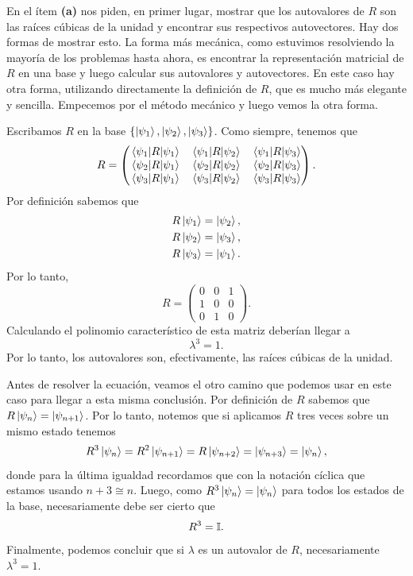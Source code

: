 \documentclass[10pt, a4paper]{article}
\numberwithin{equation}{subsection}
\begin{document}
\bigbreak

En el ítem \textbf{(a)} nos piden, en primer lugar, mostrar que los autovalores
de $R$ son las raíces cúbicas de la unidad y encontrar sus respectivos
autovectores. Hay dos formas de mostrar esto. La forma más mecánica, como
estuvimos resolviendo la mayoría de los problemas hasta ahora, es encontrar la
representación matricial de $R$ en una base y luego calcular sus autovalores y
autovectores. En este caso hay otra forma, utilizando directamente la
definición de $R$, que es mucho más elegante y sencilla. Empecemos por el
método mecánico y luego vemos la otra forma.

Escribamos $R$ en la base $\set{\ket{\psi_1}, \ket{\psi_2}, \ket{\psi_3}}$.
Como siempre, tenemos que
\begin{equation}
  R = \begin{pmatrix}
    \matrixel{\psi_1}{R}{\psi_1} &
    \matrixel{\psi_1}{R}{\psi_2} &
    \matrixel{\psi_1}{R}{\psi_3} \\
    \matrixel{\psi_2}{R}{\psi_1} &
    \matrixel{\psi_2}{R}{\psi_2} &
    \matrixel{\psi_2}{R}{\psi_3} \\
    \matrixel{\psi_3}{R}{\psi_1} &
    \matrixel{\psi_3}{R}{\psi_2} &
    \matrixel{\psi_3}{R}{\psi_3}
  \end{pmatrix}.
\end{equation}
Por definición sabemos que
\begin{align}
  R\ket{\psi_1} &= \ket{\psi_2}, \\
  R\ket{\psi_2} &= \ket{\psi_3}, \\
  R\ket{\psi_3} &= \ket{\psi_1}.
\end{align}
Por lo tanto,
\begin{equation}
  R = \begin{pmatrix} 0 & 0 & 1 \\ 1 & 0 & 0 \\ 0 & 1 & 0 \end{pmatrix}.
\end{equation}
Calculando el polinomio característico de esta matriz deberían llegar a
\begin{equation}
  \lambda^3 = 1.
\end{equation}
Por lo tanto, los autovalores son, efectivamente, las raíces cúbicas de la
unidad.

Antes de resolver la ecuación, veamos el otro camino que podemos usar en este
caso para llegar a esta misma conclusión. Por definición de $R$ sabemos
que $R\ket{\psi_n} = \ket{\psi_{n+1}}$. Por lo tanto, notemos que si aplicamos
$R$ tres veces sobre un mismo estado tenemos
\begin{equation}
  R^3\ket{\psi_n} = R^2\ket{\psi_{n+1}} = R\ket{\psi_{n+2}} = \ket{\psi_{n+3}}
  = \ket{\psi_n},
\end{equation}
donde para la última igualdad recordamos que con la notación cíclica que
estamos usando $n + 3 \cong n$. Luego, como $R^3\ket{\psi_n} = \ket{\psi_n}$
para todos los estados de la base, necesariamente debe ser cierto que
\begin{equation} \label{eq:triatom_R3Id}
  R^3 = \mathbb{I}.
\end{equation}
Finalmente, podemos concluir que si $\lambda$ es un autovalor de $R$,
necesariamente $\lambda^3 = 1$.
\end{document}
